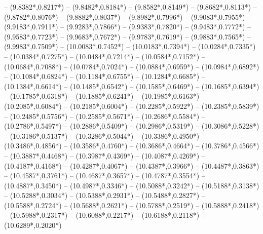 {	-- ({9.8382*\dx},{0.8217*\dy})
	-- ({9.8482*\dx},{0.8184*\dy})
	-- ({9.8582*\dx},{0.8149*\dy})
	-- ({9.8682*\dx},{0.8113*\dy})
	-- ({9.8782*\dx},{0.8076*\dy})
	-- ({9.8882*\dx},{0.8037*\dy})
	-- ({9.8982*\dx},{0.7996*\dy})
	-- ({9.9083*\dx},{0.7955*\dy})
	-- ({9.9183*\dx},{0.7911*\dy})
	-- ({9.9283*\dx},{0.7866*\dy})
	-- ({9.9383*\dx},{0.7820*\dy})
	-- ({9.9483*\dx},{0.7772*\dy})
	-- ({9.9583*\dx},{0.7723*\dy})
	-- ({9.9683*\dx},{0.7672*\dy})
	-- ({9.9783*\dx},{0.7619*\dy})
	-- ({9.9883*\dx},{0.7565*\dy})
	-- ({9.9983*\dx},{0.7509*\dy})
	-- ({10.0083*\dx},{0.7452*\dy})
	-- ({10.0183*\dx},{0.7394*\dy})
	-- ({10.0284*\dx},{0.7335*\dy})
	-- ({10.0384*\dx},{0.7275*\dy})
	-- ({10.0484*\dx},{0.7214*\dy})
	-- ({10.0584*\dx},{0.7152*\dy})
	-- ({10.0684*\dx},{0.7088*\dy})
	-- ({10.0784*\dx},{0.7024*\dy})
	-- ({10.0884*\dx},{0.6959*\dy})
	-- ({10.0984*\dx},{0.6892*\dy})
	-- ({10.1084*\dx},{0.6824*\dy})
	-- ({10.1184*\dx},{0.6755*\dy})
	-- ({10.1284*\dx},{0.6685*\dy})
	-- ({10.1384*\dx},{0.6614*\dy})
	-- ({10.1485*\dx},{0.6542*\dy})
	-- ({10.1585*\dx},{0.6469*\dy})
	-- ({10.1685*\dx},{0.6394*\dy})
	-- ({10.1785*\dx},{0.6318*\dy})
	-- ({10.1885*\dx},{0.6241*\dy})
	-- ({10.1985*\dx},{0.6163*\dy})
	-- ({10.2085*\dx},{0.6084*\dy})
	-- ({10.2185*\dx},{0.6004*\dy})
	-- ({10.2285*\dx},{0.5922*\dy})
	-- ({10.2385*\dx},{0.5839*\dy})
	-- ({10.2485*\dx},{0.5756*\dy})
	-- ({10.2585*\dx},{0.5671*\dy})
	-- ({10.2686*\dx},{0.5584*\dy})
	-- ({10.2786*\dx},{0.5497*\dy})
	-- ({10.2886*\dx},{0.5409*\dy})
	-- ({10.2986*\dx},{0.5319*\dy})
	-- ({10.3086*\dx},{0.5228*\dy})
	-- ({10.3186*\dx},{0.5137*\dy})
	-- ({10.3286*\dx},{0.5044*\dy})
	-- ({10.3386*\dx},{0.4950*\dy})
	-- ({10.3486*\dx},{0.4856*\dy})
	-- ({10.3586*\dx},{0.4760*\dy})
	-- ({10.3686*\dx},{0.4664*\dy})
	-- ({10.3786*\dx},{0.4566*\dy})
	-- ({10.3887*\dx},{0.4468*\dy})
	-- ({10.3987*\dx},{0.4369*\dy})
	-- ({10.4087*\dx},{0.4269*\dy})
	-- ({10.4187*\dx},{0.4168*\dy})
	-- ({10.4287*\dx},{0.4067*\dy})
	-- ({10.4387*\dx},{0.3966*\dy})
	-- ({10.4487*\dx},{0.3863*\dy})
	-- ({10.4587*\dx},{0.3761*\dy})
	-- ({10.4687*\dx},{0.3657*\dy})
	-- ({10.4787*\dx},{0.3554*\dy})
	-- ({10.4887*\dx},{0.3450*\dy})
	-- ({10.4987*\dx},{0.3346*\dy})
	-- ({10.5088*\dx},{0.3242*\dy})
	-- ({10.5188*\dx},{0.3138*\dy})
	-- ({10.5288*\dx},{0.3034*\dy})
	-- ({10.5388*\dx},{0.2931*\dy})
	-- ({10.5488*\dx},{0.2827*\dy})
	-- ({10.5588*\dx},{0.2724*\dy})
	-- ({10.5688*\dx},{0.2621*\dy})
	-- ({10.5788*\dx},{0.2519*\dy})
	-- ({10.5888*\dx},{0.2418*\dy})
	-- ({10.5988*\dx},{0.2317*\dy})
	-- ({10.6088*\dx},{0.2217*\dy})
	-- ({10.6188*\dx},{0.2118*\dy})
	-- ({10.6289*\dx},{0.2020*\dy})
}
